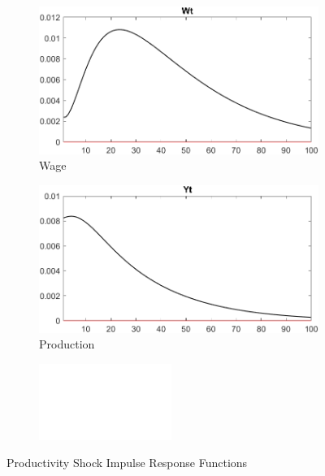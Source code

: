 \documentclass[
	12pt, 
	]{article}
\numberwithin{equation}{section}
\theoremstyle{definition}
\theoremstyle{plain}
\theoremstyle{plain}
\theoremstyle{plain}
\begin{document}
\begin{figure}[h!]
\vspace*{0.5cm}

\begin{subfigure}[b]{0.3\textwidth}
	\centering
	\includegraphics[width=\textwidth]{shock_ZAt/shock_ZAt_Wt}
	\caption{Wage}
	\label{fig:zat-wage}
\end{subfigure}
\hfill
\begin{subfigure}[b]{0.3\textwidth}
	\centering
	\includegraphics[width=\textwidth]{shock_ZAt/shock_ZAt_Yt}
	\caption{Production}
	\label{fig:zat-production}
\end{subfigure}
\hfill
\begin{subfigure}[b]{0.3\textwidth}
	\centering
	\includegraphics[width=\textwidth]{shock_ZAt/blank}
\end{subfigure}
\hfill
	\caption{Productivity Shock Impulse Response Functions}
	\label{fig:zat-irf}
\end{figure}
\end{document}

